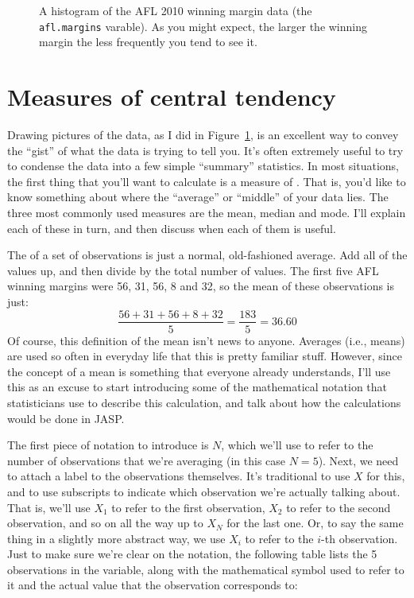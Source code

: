 \begin{figure}[ht]
\begin{center}
\caption{A histogram of the AFL 2010 winning margin data (the \texttt{afl.margins} varable). As you might expect, the larger the winning margin the less frequently you tend to see it.}
\label{fig:histogram1}
\HR
\end{center}
\end{figure}

\section{Measures of central tendency~\label{sec:centraltendency}}

Drawing pictures of the data, as I did in Figure~\ref{fig:histogram1}, is an excellent way to convey the ``gist'' of what the data is trying to tell you. It's often extremely useful to try to condense the data into a few simple ``summary'' statistics. In most situations, the first thing that you'll want to calculate is a measure of . That is, you'd like to know something about where the ``average'' or ``middle'' of your data lies. The three most commonly used measures are the mean, median and mode. I'll explain each of these in turn, and then discuss when each of them is useful.


The  of a set of observations is just a normal, old-fashioned average. Add all of the values up, and then divide by the total number of values. The first five AFL winning margins were 56, 31, 56, 8 and 32, so the mean of these observations is just:
$$
\frac{56 + 31 + 56 + 8 + 32}{5} = \frac{183}{5} = 36.60
$$
Of course, this definition of the mean isn't news to anyone. Averages (i.e., means) are used so often in everyday life that this is pretty familiar stuff. However, since the concept of a mean is something that everyone already understands, I'll use this as an excuse to start introducing some of the mathematical notation that statisticians use to describe this calculation, and talk about how the calculations would be done in JASP. 

The first piece of notation to introduce is $N$, which we'll use to refer to the number of observations that we're averaging (in this case $N = 5$). Next, we need to attach a label to the observations themselves. It's traditional to use $X$ for this, and to use subscripts to indicate which observation we're actually talking about. That is, we'll use $X_1$ to refer to the first observation, $X_2$ to refer to the second observation, and so on all the way up to $X_N$ for the last one. Or, to say the same thing in a slightly more abstract way, we use $X_i$ to refer to the $i$-th observation. Just to make sure we're clear on the notation, the following table lists the 5 observations in the  variable, along with the mathematical symbol used to refer to it and the actual value that the observation corresponds to:

